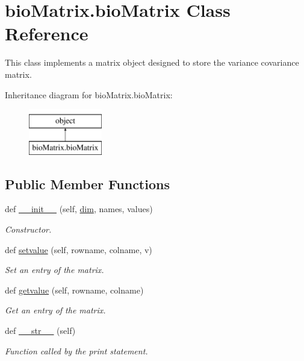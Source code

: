 \hypertarget{classbio_matrix_1_1bio_matrix}{}\section{bio\+Matrix.\+bio\+Matrix Class Reference}
\label{classbio_matrix_1_1bio_matrix}


This class implements a matrix object designed to store the variance covariance matrix.  


Inheritance diagram for bio\+Matrix.\+bio\+Matrix\+:\begin{figure}[H]
\begin{center}
\leavevmode
\includegraphics[height=2.000000cm]{classbio_matrix_1_1bio_matrix}
\end{center}
\end{figure}
\subsection*{Public Member Functions}
\begin{DoxyCompactItemize}
\item 
def \hyperlink{classbio_matrix_1_1bio_matrix_a2326c1c9534e6a68d611753d05895708}{\+\_\+\+\_\+init\+\_\+\+\_\+} (self, \hyperlink{classbio_matrix_1_1bio_matrix_a3f0a9cf4ebf8b5a5caddef88d3628d19}{dim}, names, values)
\begin{DoxyCompactList}\small\item\em Constructor. \end{DoxyCompactList}\item 
def \hyperlink{classbio_matrix_1_1bio_matrix_a2f5e8880a9774aee349f107d2680033b}{setvalue} (self, rowname, colname, v)
\begin{DoxyCompactList}\small\item\em Set an entry of the matrix. \end{DoxyCompactList}\item 
def \hyperlink{classbio_matrix_1_1bio_matrix_a0be23201892a3d6212db90b3d0ecf2b7}{getvalue} (self, rowname, colname)
\begin{DoxyCompactList}\small\item\em Get an entry of the matrix. \end{DoxyCompactList}\item 
def \hyperlink{classbio_matrix_1_1bio_matrix_a5f9812204382d3a70c84a05321064620}{\+\_\+\+\_\+str\+\_\+\+\_\+} (self)\hypertarget{classbio_matrix_1_1bio_matrix_a5f9812204382d3a70c84a05321064620}{}\label{classbio_matrix_1_1bio_matrix_a5f9812204382d3a70c84a05321064620}

\begin{DoxyCompactList}\small\item\em Function called by the print statement. \end{DoxyCompactList}\end{DoxyCompactItemize}
